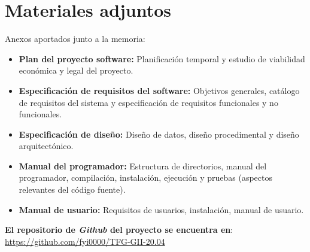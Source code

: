 \clearpage

\section{Materiales adjuntos}

Anexos aportados junto a la memoria:

\begin{itemize}
    \item \textbf{Plan del proyecto software:} Planificación temporal y estudio de viabilidad económica y legal del proyecto.
    \item \textbf{Especificación de requisitos del software:} Objetivos generales, catálogo de requisitos del sistema y especificación de requisitos funcionales y no funcionales.
    \item \textbf{Especificación de diseño:} Diseño de datos, diseño procedimental y diseño arquitectónico.
    \item \textbf{Manual del programador:} Estructura de directorios, manual del programador, compilación, instalación, ejecución y pruebas (aspectos relevantes del código fuente).
    \item \textbf{Manual de usuario:} Requisitos de usuarios, instalación, manual de usuario.
\end{itemize}

\textbf{El repositorio de \emph{Github} del proyecto se encuentra en}: \url{https://github.com/fyi0000/TFG-GII-20.04}